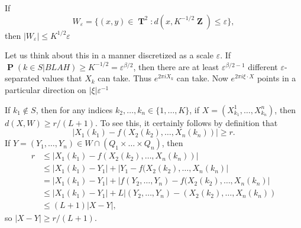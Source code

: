 \documentclass[12pt,reqno]{article}
\numberwithin{equation}{section}
\DeclareMathOperator{\RR}{\mathbf{R}}
\DeclareMathOperator{\ZZ}{\mathbf{Z}}
\DeclareMathOperator{\TT}{\mathbf{T}}
\DeclareMathOperator{\PP}{\mathbf{P}}
\begin{document}
If
%
\[ W_\varepsilon = \{ (x,y) \in \TT^2: d(x,K^{-1/2} \ZZ) \leq \varepsilon \}, \]
%
then $|W_\varepsilon| \leq K^{1/2} \varepsilon$

Let us think about this in a manner discretized as a scale $\varepsilon$. If $\PP(k \in S| BLAH) \geq K^{-1/2} = \varepsilon^{\beta/2}$, then there are at least $\varepsilon^{\beta/2-1}$ different $\varepsilon$-separated values that $X_k$ can take. Thus $e^{2 \pi i X_k}$ can take. Now $e^{2 \pi i \xi \cdot X}$ points in a particular direction on $|\xi| \varepsilon^{-1}$






If $k_1 \not \in S$, then for any indices $k_2,\dots,k_n \in \{ 1, \dots, K \}$, if $X = (X^1_{k_1},\dots,X^n_{k_n})$, then $d(X,W) \geq r/(L+1)$. To see this, it certainly follows by definition that
%
\[ |X_1(k_1) - f(X_2(k_2),\dots,X_n(k_n))| \geq r. \]
%
If $Y = (Y_1,\dots,Y_n) \in W \cap (Q_1 \times \dots \times Q_n)$, then
%
\begin{align*}
    r &\leq |X_1(k_1) - f(X_2(k_2),\dots,X_n(k_n))|\\
    &\leq |X_1(k_1) - Y_1| + |Y_1 - f(X_2(k_2),\dots,X_n(k_n)|\\
    &= |X_1(k_1) - Y_1| + |f(Y_2,\dots,Y_n) - f(X_2(k_2),\dots,X_n(k_n)|\\
    &\leq |X_1(k_1) - Y_1| + L|(Y_2,\dots,Y_n) - (X_2(k_2),\dots,X_n(k_n))\\
    &\leq (L+1) |X - Y|,
\end{align*}
%
so $|X-Y| \geq r/(L+1)$.

\begin{comment}
Suppose we can show that for any $\xi \neq 0$,
%
\[ |\widehat{Y_1}(\xi) + \dots + \widehat{Y_N}(\xi)| \lesssim C \left( \| \widehat{Y_1} \|_{L^\infty(\RR^d)}^2 + \dots + \| \widehat{Y_N} \|_{L^\infty(\ZZ^d)}^2 \right)^{1/2}. \]
%
In the example we consider, this would then imply
%
\[ |Y_1(\xi) + \dots + Y_N(\xi)| \lesssim N^{1/2}. \]
%
Thus in the last theorem we can take $N = K$,
%
\[ N \leq K^{1 - (2d/\beta)(1 - 1/p)} \]
%
If we can set $p \geq 1$,
\end{comment}
\end{document}
